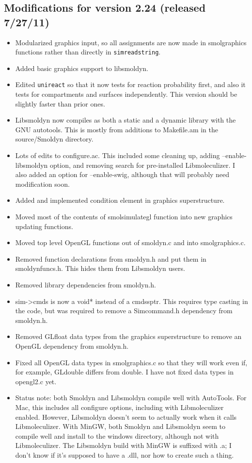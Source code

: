 \documentclass {scrbook}
\newcommand {\ttt} {\texttt}
\begin{document}
\subsection{Modifications for version 2.24 (released 7/27/11)}
\begin{itemize}
\item Modularized graphics input, so all assignments are now made in smolgraphics functions rather than directly in \ttt{simreadstring}.
\item Added basic graphics support to libsmoldyn.
\item Edited \ttt{unireact} so that it now tests for reaction probability first, and also it tests for compartments and surfaces independently. This version should be slightly faster than prior ones.
\item Libsmoldyn now compiles as both a static and a dynamic library with the GNU autotools. This is mostly from additions to Makefile.am in the source/Smoldyn directory.
\item Lots of edits to configure.ac. This included some cleaning up, adding --enable-libsmoldyn option, and removing search for pre-installed Libmoleculizer. I also added an option for --enable-swig, although that will probably need modification soon.
\item Added and implemented condition element in graphics superstructure.
\item Moved most of the contents of smolsimulategl function into new graphics updating functions.
\item Moved top level OpenGL functions out of smoldyn.c and into smolgraphics.c.
\item Removed function declarations from smoldyn.h and put them in smoldynfuncs.h. This hides them from Libsmoldyn users.
\item Removed library dependencies from smoldyn.h.
\item sim->cmds is now a void* instead of a cmdssptr. This requires type casting in the code, but was required to remove a Simcommand.h dependency from smoldyn.h.
\item Removed GLfloat data types from the graphics superstructure to remove an OpenGL dependency from smoldyn.h.
\item Fixed all OpenGL data types in smolgraphics.c so that they will work even if, for example, GLdouble differs from double. I have not fixed data types in opengl2.c yet.
\item Status note: both Smoldyn and Libsmoldyn compile well with AutoTools. For Mac, this includes all configure options, including with Libmoleculizer enabled. However, Libsmoldyn doesn't seem to actually work when it calls Libmoleculizer. With MinGW, both Smoldyn and Libsmoldyn seem to compile well and install to the windows directory, although not with Libmoleculizer. The Libsmoldyn build with MinGW is suffixed with .a; I don't know if it's supposed to have a .dll, nor how to create such a thing.

\end{itemize}
\end{document}
